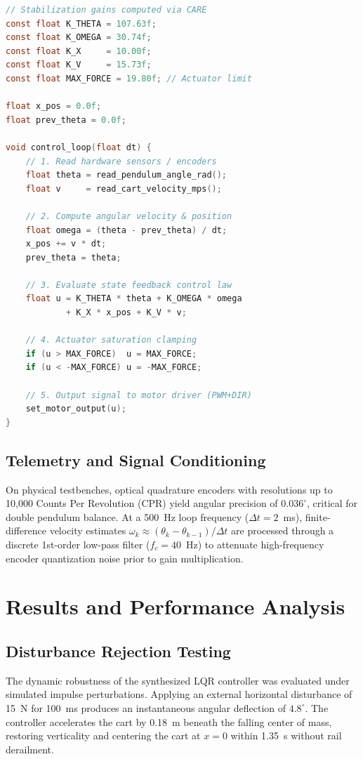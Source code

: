 \documentclass[conference]{IEEEtran}
\begin{document}
\begin{lstlisting}[language=C, caption={Embedded C/C++ control routine for real-time stabilization.}]
// Stabilization gains computed via CARE
const float K_THETA = 107.63f;
const float K_OMEGA = 30.74f;
const float K_X     = 10.00f;
const float K_V     = 15.73f;
const float MAX_FORCE = 19.80f; // Actuator limit

float x_pos = 0.0f;
float prev_theta = 0.0f;

void control_loop(float dt) {
    // 1. Read hardware sensors / encoders
    float theta = read_pendulum_angle_rad();
    float v     = read_cart_velocity_mps();

    // 2. Compute angular velocity & position
    float omega = (theta - prev_theta) / dt;
    x_pos += v * dt;
    prev_theta = theta;

    // 3. Evaluate state feedback control law
    float u = K_THETA * theta + K_OMEGA * omega
            + K_X * x_pos + K_V * v;

    // 4. Actuator saturation clamping
    if (u > MAX_FORCE)  u = MAX_FORCE;
    if (u < -MAX_FORCE) u = -MAX_FORCE;

    // 5. Output signal to motor driver (PWM+DIR)
    set_motor_output(u);
}
\end{lstlisting}

\subsection{Telemetry and Signal Conditioning}
On physical testbenches, optical quadrature encoders with resolutions up to 10,000 Counts Per Revolution (CPR) yield angular precision of $0.036^\circ$, critical for double pendulum balance. At a 500~Hz loop frequency ($\Delta t = 2$~ms), finite-difference velocity estimates $\omega_k \approx (\theta_k - \theta_{k-1})/\Delta t$ are processed through a discrete 1st-order low-pass filter ($f_c = 40$~Hz) to attenuate high-frequency encoder quantization noise prior to gain multiplication.

\section{Results and Performance Analysis}

\subsection{Disturbance Rejection Testing}
The dynamic robustness of the synthesized LQR controller was evaluated under simulated impulse perturbations. Applying an external horizontal disturbance of 15~N for 100~ms produces an instantaneous angular deflection of $4.8^\circ$. The controller accelerates the cart by 0.18~m beneath the falling center of mass, restoring verticality and centering the cart at $x = 0$ within 1.35~s without rail derailment.
\end{document}
